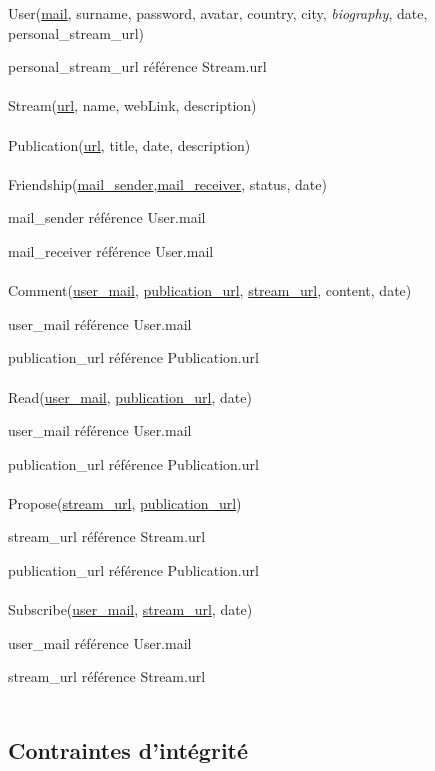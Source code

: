 \documentclass[a4paper,10pt]{article}
\begin{document}
User(\underline {mail}, surname, password, avatar, country, city, \textsl{biography},  date, personal\_stream\_url)

personal\_stream\_url référence Stream.url
\\\\
Stream(\underline {url}, name, webLink, description)
\\\\
Publication(\underline {url}, title, date, description)
\\\\
Friendship(\underline {mail\_sender},\underline {mail\_receiver}, status, date)

mail\_sender référence User.mail 

mail\_receiver référence User.mail
\\\\
Comment(\underline {user\_mail}, \underline {publication\_url}, \underline {stream\_url}, content, date)

user\_mail référence User.mail

publication\_url référence Publication.url
\\\\
Read(\underline {user\_mail}, \underline {publication\_url}, date)

user\_mail référence User.mail

publication\_url référence Publication.url
\\\\
Propose(\underline {stream\_url}, \underline {publication\_url})

stream\_url référence Stream.url

publication\_url référence Publication.url
\\\\
Subscribe(\underline {user\_mail}, \underline {stream\_url}, date)

user\_mail référence User.mail

stream\_url référence Stream.url
\\\\

\subsection{Contraintes d’intégrité}
\end{document}
